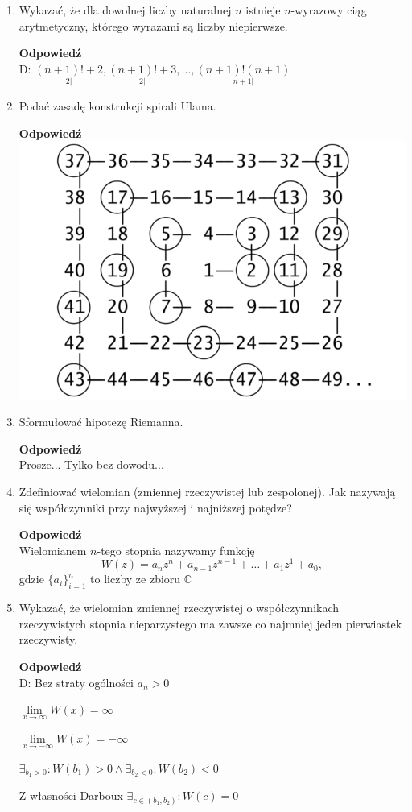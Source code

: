 \documentclass[12pt,a4paper]{article}
\theoremstyle{break}
\newcommand{\Odp}[1]{
		\begin{mdframed}[style=zadanie]
			\textbf{Odpowiedź}\\
			#1
		\end{mdframed}
	}
\begin{document}
\begin{enumerate}[1.]
{		Hp. $\exists_r : r$ - różnica tego ciągu i wszystkie jego wyrazy to liczby pierwsze.
		
		$p,p+r,p+2r,\dots,p+pr = p(1+r) \Rightarrow p|p(1+r)$ Sprzeczność 
	}
	
	\item Wykazać, że dla dowolnej liczby naturalnej $n$ istnieje $n$-wyrazowy ciąg arytmetyczny,
	którego wyrazami są liczby niepierwsze.
	\Odp{
		D: $\underset{2|}{(n+1)!+2},\underset{2|}{(n+1)!+3},\dots,\underset{n+1|}{(n+1)!(n+1)}$
	}
	
	\item Podać zasadę konstrukcji spirali Ulama.
	\Odp{
		
		\centering
		\includegraphics[width = 0.75\linewidth]{Ulam_Spiral.png}
	}
	
	\item Sformułować hipotezę Riemanna.
	\Odp{
		Prosze... Tylko bez dowodu...
	}
	
	\item Zdeﬁniować wielomian (zmiennej rzeczywistej lub zespolonej). Jak nazywają się współczynniki przy najwyższej i najniższej potędze?
	\Odp{
		Wielomianem $n$-tego stopnia nazywamy funkcję
		$$W(z)=a_nz^n+a_{n-1}z^{n-1}+\dots+a_1z^1+a_0,$$
		gdzie $\{a_i\}_{i=1}^n$ to liczby ze zbioru $\mathbb{C}$
	}
	
	\item Wykazać, że wielomian zmiennej rzeczywistej o współczynnikach rzeczywistych stopnia nieparzystego ma zawsze co najmniej jeden pierwiastek rzeczywisty.
	\Odp{
		D: Bez straty ogólności $a_n>0$
		
		$\lim\limits_{x\rightarrow \infty} W(x) = \infty$
		
		$\lim\limits_{x\rightarrow -\infty} W(x) = -\infty$
		
		$\exists_{b_1>0}: W(b_1)>0 \wedge \exists_{b_2<0}: W(b_2)<0$
		
		Z własności Darboux $\exists_{c\in (b_1,b_2)}: W(c)=0$
	}
	

\end{enumerate}
\end{document}
